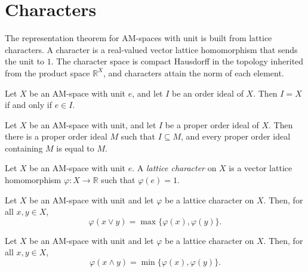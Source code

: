 \section{Characters}

The representation theorem for AM-spaces with unit is built from
lattice characters. A character is a real-valued vector lattice
homomorphism that sends the unit to $1$. The character space is
compact Hausdorff in the topology inherited from the product
space $\mathbb{R}^{X}$, and characters attain the norm of each
element.

\begin{lemma}
\label{lem:amSpaceWithUnit-top-iff-unit-mem}
\leanok
{}
Let $X$ be an AM-space with unit $e$, and let $I$ be an order ideal
of $X$. Then $I = X$ if and only if $e \in I$.
\end{lemma}

\begin{theorem}
\label{thm:amSpaceWithUnit-exists-le-maximal}
\leanok
{}
Let $X$ be an AM-space with unit, and let $I$ be a proper order
ideal of $X$. Then there is a proper order ideal $M$ such that
$I \subseteq M$, and every proper order ideal containing $M$ is
equal to $M$.
\end{theorem}

\begin{definition}
\label{def:lattice-character}
\leanok
{}
Let $X$ be an AM-space with unit $e$. A \emph{lattice character} on
$X$ is a vector lattice homomorphism $\varphi \colon X \to
\mathbb{R}$ such that $\varphi(e)=1$.
\end{definition}

\begin{lemma}
\label{lem:latticeCharacter-map-sup}
\leanok
{}
Let $X$ be an AM-space with unit and let $\varphi$ be a lattice
character on $X$. Then, for all $x,y \in X$,
\[
  \varphi(x \vee y) = \max\{\varphi(x),\varphi(y)\}.
\]
\end{lemma}

\begin{lemma}
\label{lem:latticeCharacter-map-inf}
\leanok
{}
Let $X$ be an AM-space with unit and let $\varphi$ be a lattice
character on $X$. Then, for all $x,y \in X$,
\[
  \varphi(x \wedge y) = \min\{\varphi(x),\varphi(y)\}.
\]
\end{lemma}

